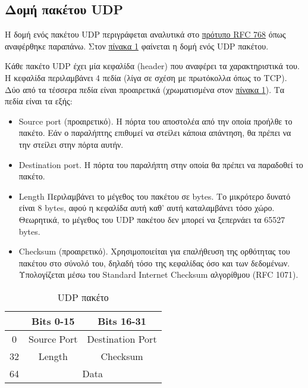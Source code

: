 \subsection{Δομή πακέτου UDP}
Η δομή ενός πακέτου UDP περιγράφεται αναλυτικά στο \href{http://tools.ietf.org/html/rfc768 RFC 768}{πρότυπο RFC 768} όπως αναφέρθηκε παραπάνω.
Στον \hyperref[table:udp-header]{πίνακα \ref{table:udp-header}} φαίνεται η δομή ενός UDP πακέτου.

Κάθε πακέτο UDP έχει μία κεφαλίδα (header) που αναφέρει τα χαρακτηριστικά του. Η κεφαλίδα περιλαμβάνει 4 πεδία (λίγα σε σχέση με πρωτόκολλα όπως το TCP).
Δύο από τα τέσσερα πεδία είναι προαιρετικά
(\textcolor{blue!25}{χρωματισμένα} στον \hyperref[table:udp-header]{πίνακα \ref{table:udp-header}}).
Τα πεδία είναι τα εξής:
\begin{itemize}
\item Source port (προαιρετικό).
Η πόρτα του αποστολέα από την οποία προήλθε το πακέτο. Εάν ο παραλήπτης επιθυμεί να στείλει κάποια απάντηση, θα πρέπει να την στείλει στην πόρτα αυτήν.

\item Destination port.
Η πόρτα του παραλήπτη στην οποία θα πρέπει να παραδοθεί το πακέτο.

\item Length
Περιλαμβάνει το μέγεθος του πακέτου σε bytes. Το μικρότερο δυνατό είναι 8 bytes, αφού η κεφαλίδα αυτή καθ' αυτή καταλαμβάνει τόσο χώρο.
Θεωρητικά, το μέγεθος του UDP πακέτου δεν μπορεί να ξεπερνάει τα 65527 bytes.

\item Checksum (προαιρετικό).
Χρησιμοποιείται για επαλήθευση της ορθότητας του πακέτου στο σύνολό του, δηλαδή τόσο της κεφαλίδας όσο και των δεδομένων.
Υπολογίζεται μέσω του Standard Internet Checksum αλγορίθμου (RFC 1071)\cite{rfc1071}\cite{udp-erg-abdn}.
\end{itemize}

\begin{table}
\centering
\begin{tabular}{|c|c|c|}
\hline
{}&\bfseries{Bits 0-15}&\bfseries{Bits 16-31}\\\hline
0&\cellcolor{blue!25}Source Port&Destination Port\\\hline
32&Length&\cellcolor{blue!25}Checksum\\\hline
64&\multicolumn{2}{c|}{Data}\\\hline
\end{tabular}
\caption{UDP πακέτο}\label{table:udp-header}
\end{table}
